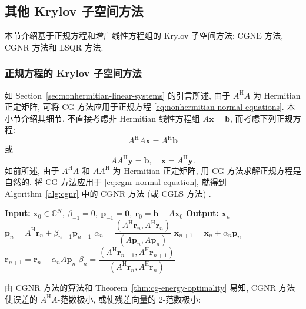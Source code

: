 \subsection{{其他 Krylov 子空间方法}}\label{sec:other-krylov-methods}
{本节介绍基于正规方程和增广线性方程组的 Krylov 子空间方法: CGNE 方法, CGNR 方法和 LSQR 方法.}
\subsubsection{{正规方程的 Krylov 子空间方法}}\label{subsec:cg-normal-equations}
{如 Section\ \ref{sec:nonhermitian-linear-systems} 的引言所述, 由于 $A^{\mathrm H}A$ 为 Hermitian 正定矩阵, 可将 CG 方法应用于正规方程 \eqref{eq:nonhermitian-normal-equations}. 本小节介绍其细节. 不直接考虑非 Hermitian 线性方程组 $A\bm x=\bm b$, 而考虑下列正规方程:}
\begin{equation}\label{eq:cgnr-normal-equation}A^{\mathrm H}A\bm x=A^{\mathrm H}\bm b\end{equation}
{或}
\begin{equation}\label{eq:cgne-normal-equation}AA^{\mathrm H}\bm y=\bm b,\quad\bm x=A^{\mathrm H}\bm y.\end{equation}
{如前所述, 由于 $A^{\mathrm H}A$ 和 $AA^{\mathrm H}$ 为 Hermitian 正定矩阵, 用 CG 方法求解正规方程是自然的. 将 CG 方法应用于 \eqref{eq:cgnr-normal-equation}, 就得到 Algorithm\ \ref{alg:cgnr} 中的 CGNR 方法 (或 CGLS 方法) .}
\begin{algorithm}[H]\caption{{CGNR 方法}}\label{alg:cgnr}\begin{algorithmic}[1]
\Statex\textbf{Input:} $\bm x_0\in\mathbb C^N,\ \beta_{-1}=0,\ \bm p_{-1}=\bm0,\ \bm r_0=\bm b-A\bm x_0$
\Statex\textbf{Output:} $\bm x_n$
\State $\bm p_n=A^{\mathrm H}\bm r_n+\beta_{n-1}\bm p_{n-1}$
\State $\alpha_n=\dfrac{(A^{\mathrm H}\bm r_n,A^{\mathrm H}\bm r_n)}{(A\bm p_n,A\bm p_n)}$
\State $\bm x_{n+1}=\bm x_n+\alpha_n\bm p_n$
\State $\bm r_{n+1}=\bm r_n-\alpha_nA\bm p_n$
\State $\beta_n=\dfrac{(A^{\mathrm H}\bm r_{n+1},A^{\mathrm H}\bm r_{n+1})}{(A^{\mathrm H}\bm r_n,A^{\mathrm H}\bm r_n)}$
\EndFor\end{algorithmic}\end{algorithm}
{由 CGNR 方法的算法和 Theorem\ \ref{thm:cg-energy-optimality} 易知, CGNR 方法使误差的 $A^{\mathrm H}A$-范数极小, 或使残差向量的 2-范数极小:}
